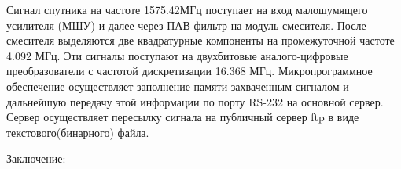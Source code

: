 \documentclass[a4paper,12pt]{article}
\numberwithin{equation}{section}		%
\numberwithin{table}{section}
\begin{document}
Сигнал спутника на частоте 1575.42МГц поступает на вход малошумящего усилителя (МШУ) и далее через ПАВ фильтр на модуль смесителя.
После смесителя выделяются две квадратурные компоненты на промежуточной частоте 4.092 МГц.
Эти сигналы поступают на двухбитовые аналого-цифровые преобразователи с частотой дискретизации 16.368 МГц.
Микропрограммное обеспечение осуществляет заполнение памяти захваченным сигналом и дальнейшую передачу этой информации
по порту RS-232 на основной сервер. Сервер осуществляет пересылку сигнала на публичный сервер ftp в виде текстового(бинарного) файла.

Заключение:


\end{document}
